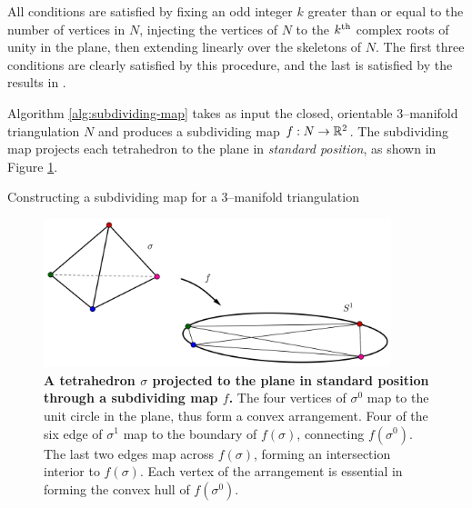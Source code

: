 All conditions are satisfied by fixing an odd integer $k$ greater than or equal to the number of vertices in $N$, injecting the vertices of $N$ to the $k^{\text{th}}$ complex roots of unity in the plane, then extending linearly over the skeletons of $N$.
The first three conditions are clearly satisfied by this procedure, and the last is satisfied by the results in \cite{PoonRub98}.

Algorithm \ref{alg:subdividing-map} takes as input the closed, orientable 3--manifold triangulation $N$ and produces a subdividing map $f:N\to\mathbb{R}^2$.
The subdividing map projects each tetrahedron to the plane in \emph{standard position}, as shown in Figure \ref{fig:standard-position}.



\begin{algorithm}
	\caption{Constructing a subdividing map for a 3--manifold triangulation}
	\label{alg:subdividing-map}
\end{algorithm}


\begin{figure}[h!]
	\centering
	\includegraphics[width=0.9\textwidth]{figures/standard-position.png}
	\caption{
		\textbf{A tetrahedron $\sigma$ projected to the plane in standard position through a subdividing map $f$.}
		The four vertices of $\sigma^0$ map to the unit circle in the plane, thus form a convex arrangement.
		Four of the six edge of $\sigma^1$ map to the boundary of $f(\sigma)$, connecting $f(\sigma^0)$.
		The last two edges map across $f(\sigma)$, forming an intersection interior to $f(\sigma)$.
		Each vertex of the arrangement is essential in forming the convex hull of $f(\sigma^0)$.
	}
	\label{fig:standard-position}
\end{figure}